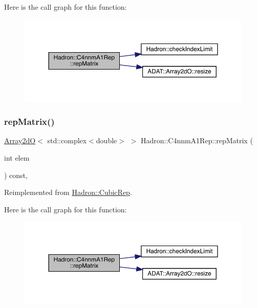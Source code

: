 Here is the call graph for this function\+:
\nopagebreak
\begin{figure}[H]
\begin{center}
\leavevmode
\includegraphics[width=350pt]{d4/dbc/structHadron_1_1C4nnmA1Rep_afd420b29cea68de99ec5e175a42bafc7_cgraph}
\end{center}
\end{figure}
\mbox{\label{structHadron_1_1C4nnmA1Rep_afd420b29cea68de99ec5e175a42bafc7}} 
\subsubsection{\texorpdfstring{repMatrix()}{repMatrix()}\hspace{0.1cm}{\footnotesize\ttfamily [2/3]}}
{\footnotesize\ttfamily \mbox{\hyperlink{classADAT_1_1Array2dO}{Array2dO}}$<$ std\+::complex$<$double$>$ $>$ Hadron\+::\+C4nnm\+A1\+Rep\+::rep\+Matrix (\begin{DoxyParamCaption}\item[{int}]{elem }\end{DoxyParamCaption}) const\hspace{0.3cm}{\ttfamily [inline]}, {\ttfamily [virtual]}}



Reimplemented from \mbox{\hyperlink{structHadron_1_1CubicRep_ac5d7e9e6f4ab1158b5fce3e4ad9e8005}{Hadron\+::\+Cubic\+Rep}}.

Here is the call graph for this function\+:
\nopagebreak
\begin{figure}[H]
\begin{center}
\leavevmode
\includegraphics[width=350pt]{d4/dbc/structHadron_1_1C4nnmA1Rep_afd420b29cea68de99ec5e175a42bafc7_cgraph}
\end{center}
\end{figure}
\mbox{\label{structHadron_1_1C4nnmA1Rep_afd420b29cea68de99ec5e175a42bafc7}} 

